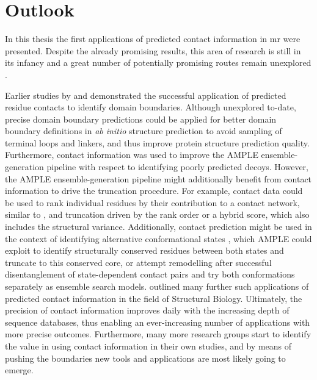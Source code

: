 \section{Outlook}
In this thesis the first applications of predicted contact information in \gls{mr} were presented. Despite the already promising results, this area of research is still in its infancy and a great number of potentially promising routes remain unexplored \cite{Simkovic2017-xs}. 

Earlier studies by \textcite{Rigden2002-mf} and \textcite{Sadowski2013-zu} demonstrated the successful application of predicted residue contacts to identify domain boundaries. Although unexplored to-date, precise domain boundary predictions could be applied for better domain boundary definitions in \textit{ab initio} structure prediction to avoid sampling of terminal loops and linkers, and thus improve protein structure prediction quality. Furthermore, contact information was used to improve the AMPLE ensemble-generation pipeline with respect to identifying poorly predicted decoys. However, the AMPLE ensemble-generation pipeline might additionally benefit from contact information to drive the truncation procedure. For example, contact data could be used to rank individual residues by their contribution to a contact network, similar to \cite{Parente2015-mv}, and truncation driven by the rank order or a hybrid score, which also includes the structural variance. Additionally, contact prediction might be used in the context of identifying alternative conformational states \cite{Hopf2012-zl,Jana2014-rw,Sfriso2016-ml,Morcos2013-ks, Sutto2015-ck}, which AMPLE could exploit to identify structurally conserved residues between both states and truncate to this conserved core, or attempt remodelling after successful disentanglement of state-dependent contact pairs and try both conformations separately as ensemble search models. \textcite{Simkovic2017-xs} outlined many further such applications of predicted contact information in the field of Structural Biology. Ultimately, the precision of contact information improves daily with the increasing depth of sequence databases, thus enabling an ever-increasing number of applications with more precise outcomes. Furthermore, many more research groups start to identify the value in using contact information in their own studies, and by means of pushing the boundaries new tools and applications are most likely going to emerge. 

